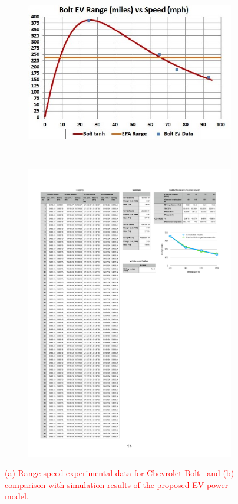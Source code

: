 \documentclass{IEEEtran}
\begin{document}
\begin{figure}   %
\centering
	\begin{subfigure}{0.47\textwidth}
	\includegraphics[width=\hsize]{Figures/Bolt_EV_range.jpg}
	\caption{}
	\label{fig:range_speed_exp}
	\end{subfigure}
~
	\begin{subfigure}{0.47\textwidth}
	\includegraphics[width=\hsize]{Figures/Range-speed_validation.pdf}
	\caption{}
	\label{fig:range_speed_valid}
	\end{subfigure}
\caption{\textcolor{red}{(a) Range-speed experimental data for Chevrolet Bolt~\cite{GM_Bolt:range_speed} and (b) comparison with simulation results of the proposed EV power model.}}
\end{figure}
\end{document}
